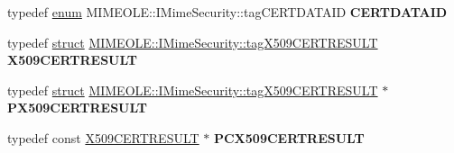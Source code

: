 \begin{DoxyCompactItemize}
\mbox{\label{interface_m_i_m_e_o_l_e_1_1_i_mime_security_a64ca7114a1b72050384320cb25fae802}} 
typedef \hyperlink{interfaceenum}{enum} M\+I\+M\+E\+O\+L\+E\+::\+I\+Mime\+Security\+::tag\+C\+E\+R\+T\+D\+A\+T\+A\+ID {\bfseries C\+E\+R\+T\+D\+A\+T\+A\+ID}
\item 
\mbox{\label{interface_m_i_m_e_o_l_e_1_1_i_mime_security_ad8be73eada32eff54e11728133fd67d8}} 
typedef \hyperlink{interfacestruct}{struct} \hyperlink{struct_m_i_m_e_o_l_e_1_1_i_mime_security_1_1tag_x509_c_e_r_t_r_e_s_u_l_t}{M\+I\+M\+E\+O\+L\+E\+::\+I\+Mime\+Security\+::tag\+X509\+C\+E\+R\+T\+R\+E\+S\+U\+LT} {\bfseries X509\+C\+E\+R\+T\+R\+E\+S\+U\+LT}
\item 
\mbox{\label{interface_m_i_m_e_o_l_e_1_1_i_mime_security_a9e24e0368129b14fec244d5283e936ad}} 
typedef \hyperlink{interfacestruct}{struct} \hyperlink{struct_m_i_m_e_o_l_e_1_1_i_mime_security_1_1tag_x509_c_e_r_t_r_e_s_u_l_t}{M\+I\+M\+E\+O\+L\+E\+::\+I\+Mime\+Security\+::tag\+X509\+C\+E\+R\+T\+R\+E\+S\+U\+LT} $\ast$ {\bfseries P\+X509\+C\+E\+R\+T\+R\+E\+S\+U\+LT}
\item 
\mbox{\label{interface_m_i_m_e_o_l_e_1_1_i_mime_security_a034c58f96bed87bcce72b7152f31c602}} 
typedef const \hyperlink{struct_m_i_m_e_o_l_e_1_1_i_mime_security_1_1tag_x509_c_e_r_t_r_e_s_u_l_t}{X509\+C\+E\+R\+T\+R\+E\+S\+U\+LT} $\ast$ {\bfseries P\+C\+X509\+C\+E\+R\+T\+R\+E\+S\+U\+LT}
\end{DoxyCompactItemize}

